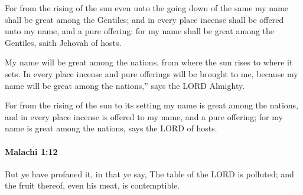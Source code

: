 			\begin{versebox}
					\item[BHS] 
					\item[LXX] 
					\item[ASV] For from the rising of the sun even unto the going down of the same my name shall be great among the Gentiles; and in every place incense shall be offered unto my name, and a pure offering: for my name shall be great among the Gentiles, saith Jehovah of hosts.
					\item[NIV] My name will be great among the nations, from where the sun rises to where it sets. In every place incense and pure offerings will be brought to me, because my name will be great among the nations,” says the LORD Almighty.
					\item[NRSV] For from the rising of the sun to its setting my name is great among the nations, and in every place incense is offered to my name, and a pure offering; for my name is great among the nations, says the LORD of hosts.
			\end{versebox}

		\paragraph{Malachi 1:12} %
			\label{MALACHI-1-12}

			But ye have profaned it, in that ye say, The table of the LORD is polluted; and the fruit thereof, even his meat, is contemptible.

